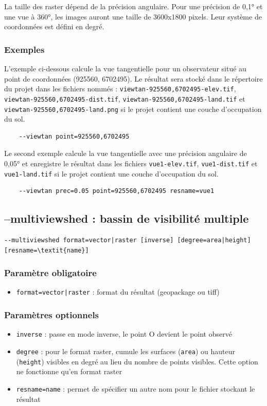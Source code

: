 \documentclass{report}
\begin{document}
La taille des raster dépend de la précision angulaire. Pour une précision de 0,1° et une vue à 360°, les images auront une taille de 3600x1800 pixels. Leur système de coordonnées est défini en degré. 

\subsubsection{Exemples}
L'exemple ci-dessous calcule la vue tangentielle pour un observateur situé au point de coordonnées (925560, 6702495). Le résultat sera stocké dans le répertoire du projet dans les fichiers nommés : \verb|viewtan-925560,6702495-elev.tif|, \verb|viewtan-925560,6702495-dist.tif|, \verb|viewtan-925560,6702495-land.tif| et \verb|viewtan-925560,6702495-land.png| si le projet contient une couche d'occupation du sol.
\begin{Verbatim}
	--viewtan point=925560,6702495
\end{Verbatim}

Le second exemple calcule la vue tangentielle avec une précision angulaire de 0,05° et enregistre le résultat dans les fichiers \verb|vue1-elev.tif|, \verb|vue1-dist.tif| et \verb|vue1-land.tif| si le projet contient une couche d'occupation du sol.
\begin{Verbatim}
	--viewtan prec=0.05 point=925560,6702495 resname=vue1
\end{Verbatim}


\subsection{--multiviewshed : bassin de visibilité multiple}
\begin{Verbatim}[commandchars=\\\{\}]
--multiviewshed format=vector|raster [inverse] [degree=area|height] [resname=\textit{name}]
\end{Verbatim}

\subsubsection{Paramètre obligatoire}
\begin{itemize}
	\item \verb/format=vector|raster/ : format du résultat (geopackage ou tiff)
\end{itemize}

\subsubsection{Paramètres optionnels}
\begin{itemize}
	\item \verb|inverse| : passe en mode inverse, le point O devient le point observé
	\item \verb|degree| : pour le format raster, cumule les surfaces (\verb|area|) ou hauteur (\verb|height|) visibles en degré au lieu du nombre de points visibles. Cette option ne fonctionne qu'en format raster
	\item \verb|resname=name| : permet de spécifier un autre nom pour le fichier stockant le résultat
\end{itemize}
\end{document}
